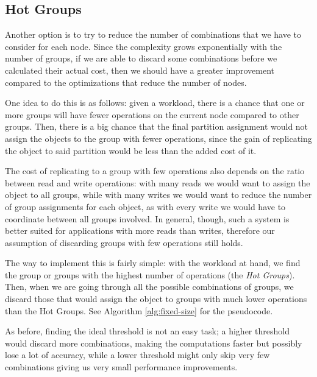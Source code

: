 \subsection{Hot Groups}\label{sec:hot-groups}
Another option is to try to reduce the number of combinations that we have to consider for each node. Since the complexity grows exponentially with the number of groups, if we are able to discard some combinations before we calculated their actual cost, then we should have a greater improvement compared to the optimizations that reduce the number of nodes.

One idea to do this is as follows: given a workload, there is a chance that one or more groups will have fewer operations on the current node compared to other groups. Then, there is a big chance that the final partition assignment would not assign the objects to the group with fewer operations, since the gain of replicating the object to said partition would be less than the added cost of it.

The cost of replicating to a group with few operations also depends on the ratio between read and write operations: with many reads we would want to assign the object to all groups, while with many writes we would want to reduce the number of group assignments for each object, as with every write we would have to coordinate between all groups involved. In general, though, such a system is better suited for applications with more reads than writes, therefore our assumption of discarding groups with few operations still holds.

The way to implement this is fairly simple: with the workload at hand, we find the group or groups with the highest number of operations (the \emph{Hot Groups}). Then, when we are going through all the possible combinations of groups, we discard those that would assign the object to groups with much lower operations than the Hot Groups.  See Algorithm \ref{alg:fixed-size} for the pseudocode.

As before, finding the ideal threshold is not an easy task; a higher threshold would discard more combinations, making the computations faster but possibly lose a lot of accuracy, while a lower threshold might only skip very few combinations giving us very small performance improvements. 


